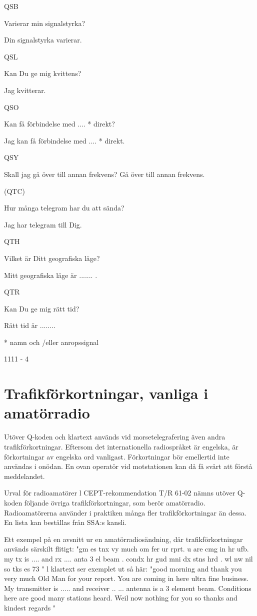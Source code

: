 QSB

Varierar min signalstyrka?

Din signalstyrka varierar.

QSL

Kan Du ge mig kvittens?

Jag kvitterar.

QSO

Kan
få förbindelse med
.... * direkt?

Jag kan få förbindelse med .... * direkt.

QSY

Skall jag gå över till annan frekvens? Gå över till annan frekvens.

(QTC)

Hur många telegram har du att
sända?

Jag har telegram till Dig.

QTH

Vilket är Ditt geografiska läge?

Mitt geografiska läge är ....... .

QTR

Kan Du ge mig rätt tid?

Rätt tid är ........

* namn och /eller anropssignal

1111 - 4

\section{Trafikförkortningar, vanliga i amatörradio}
Utöver Q-koden och klartext används vid
morsetelegrafering även andra trafikförkortningar. Eftersom det internationella radiospråket är engelska, är förkortningar av engelska ord vanligast.
Förkortningar bör emellertid inte användas i onödan. En ovan operatör vid motstationen kan då få svårt att förstå meddelandet.

Urval för radioamatörer
l CEPT-rekommendation T/R 61-02 nämns
utöver Q-koden följande övriga trafikförkortningar, som berör amatörradio.
Radioamatörerna använder i praktiken
många fler trafikförkortningar än dessa. En
lista kan beställas från SSA:s kansli.

Ett exempel på en avsnitt ur en amatörradiosändning, där trafikförkortningar används
särskilt flitigt:
"gm es tnx vy much om fer ur rprt. u are
cmg in hr ufb. my tx is .... and rx .... anta 3
el beam . condx hr gud mni dx stns hrd . wl
nw nil so tks es 73 "
l klartext ser exemplet ut så här:
"good morning and thank you very much
Old Man for your report. You are coming in
here ultra fine business. My transmitter is .....
and receiver .. ... antenna is a 3 element
beam. Conditions here are good many
stations heard. Weil now nothing for you so
thanks and kindest regards "

